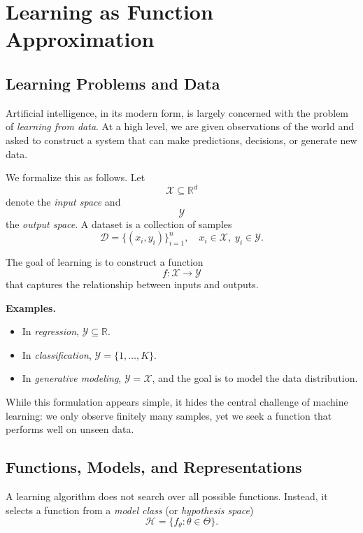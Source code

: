 
\chapter{Learning as Function Approximation}

\section{Learning Problems and Data}

Artificial intelligence, in its modern form, is largely concerned with the problem of \emph{learning from data}. At a high level, we are given observations of the world and asked to construct a system that can make predictions, decisions, or generate new data.

We formalize this as follows. Let
\[
\mathcal{X} \subseteq \mathbb{R}^d
\]
denote the \emph{input space} and
\[
\mathcal{Y}
\]
the \emph{output space}. A dataset is a collection of samples
\[
\mathcal{D} = \{(x_i, y_i)\}_{i=1}^n, \quad x_i \in \mathcal{X}, \; y_i \in \mathcal{Y}.
\]

The goal of learning is to construct a function
\[
f : \mathcal{X} \to \mathcal{Y}
\]
that captures the relationship between inputs and outputs.

\medskip

\noindent
\textbf{Examples.}
\begin{itemize}
    \item In \emph{regression}, $\mathcal{Y} \subseteq \mathbb{R}$.
    \item In \emph{classification}, $\mathcal{Y} = \{1, \dots, K\}$.
    \item In \emph{generative modeling}, $\mathcal{Y} = \mathcal{X}$, and the goal is to model the data distribution.
\end{itemize}

\medskip

While this formulation appears simple, it hides the central challenge of machine learning: we only observe finitely many samples, yet we seek a function that performs well on unseen data.

\section{Functions, Models, and Representations}

A learning algorithm does not search over all possible functions. Instead, it selects a function from a \emph{model class} (or \emph{hypothesis space})
\[
\mathcal{H} = \{ f_\theta : \theta \in \Theta \}.
\]

